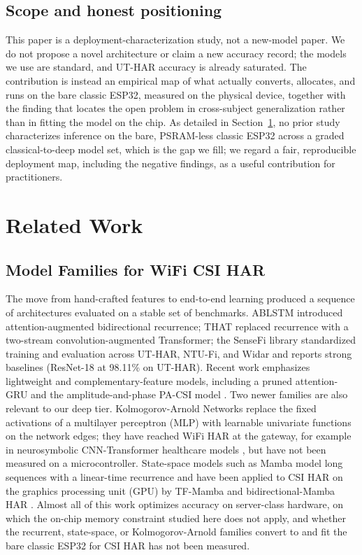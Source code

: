 \documentclass{ieeeaccess}
\begin{document}
\subsection{Scope and honest positioning}
\label{sec:scope}
This paper is a deployment-characterization study, not a new-model paper. We do not propose a novel architecture or claim a new accuracy record; the models we use are standard, and UT-HAR accuracy is already saturated. The contribution is instead an empirical map of what actually converts, allocates, and runs on the bare classic ESP32, measured on the physical device, together with the finding that locates the open problem in cross-subject generalization rather than in fitting the model on the chip. As detailed in Section~\ref{sec:related}, no prior study characterizes inference on the bare, PSRAM-less classic ESP32 across a graded classical-to-deep model set, which is the gap we fill; we regard a fair, reproducible deployment map, including the negative findings, as a useful contribution for practitioners.

\section{Related Work}
\label{sec:related}

\subsection{Model Families for WiFi CSI HAR}
The move from hand-crafted features to end-to-end learning produced a sequence of architectures evaluated on a stable set of benchmarks. ABLSTM \cite{chen2019ablstm} introduced attention-augmented bidirectional recurrence; THAT \cite{li2021that} replaced recurrence with a two-stream convolution-augmented Transformer; the SenseFi library \cite{yang2023sensefi} standardized training and evaluation across UT-HAR, NTU-Fi, and Widar and reports strong baselines (ResNet-18 at 98.11\% on UT-HAR). Recent work emphasizes lightweight and complementary-feature models, including a pruned attention-GRU \cite{khan2025lightweight} and the amplitude-and-phase PA-CSI model \cite{pacsi2025}. Two newer families are also relevant to our deep tier. Kolmogorov-Arnold Networks \cite{kanorig2024} replace the fixed activations of a multilayer perceptron (MLP) with learnable univariate functions on the network edges; they have reached WiFi HAR at the gateway, for example in neurosymbolic CNN-Transformer healthcare models \cite{neurosym2025}, but have not been measured on a microcontroller. State-space models such as Mamba \cite{gu2023mamba} model long sequences with a linear-time recurrence and have been applied to CSI HAR on the graphics processing unit (GPU) by TF-Mamba \cite{tfmamba2025} and bidirectional-Mamba HAR \cite{bimamba2025}. Almost all of this work optimizes accuracy on server-class hardware, on which the on-chip memory constraint studied here does not apply, and whether the recurrent, state-space, or Kolmogorov-Arnold families convert to and fit the bare classic ESP32 for CSI HAR has not been measured.
\end{document}
